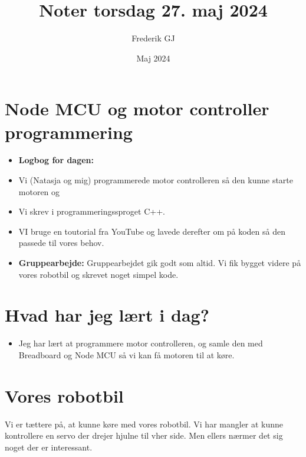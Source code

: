 \documentclass{article}
\title{Noter torsdag 27. maj 2024}
\author{Frederik GJ}
\date{Maj 2024}
\begin{document}
\maketitle

\section{Node MCU og motor controller programmering}

\begin{itemize}
    \item \textbf{Logbog for dagen:}
    \item Vi (Natasja og mig) programmerede motor controlleren så den kunne starte motoren og 
    \item Vi skrev i programmeringssproget C++. 
    \item VI bruge en toutorial fra YouTube og lavede derefter om på koden så den passede til vores behov. 
    \item \textbf{Gruppearbejde:} Gruppearbejdet gik godt som altid. Vi fik bygget videre på vores robotbil og skrevet noget simpel kode. 
\end{itemize}

\section{Hvad har jeg lært i dag?}
\begin{itemize}
    \item Jeg har lært at programmere motor controlleren, og samle den med Breadboard og Node MCU så vi kan få motoren til at køre.  
\end{itemize}

\section{Vores robotbil}
Vi er tættere på, at kunne køre med vores robotbil. Vi har mangler at kunne kontrollere en servo der drejer hjulne til vher side. Men ellers nærmer det sig noget der er interessant.  
\end{document}
